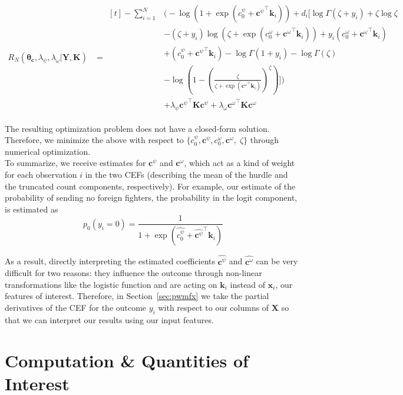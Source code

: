 \documentclass[12pt]{article}
\newcommand{\X}{\mathbf{X}}
\newcommand{\x}{\mathbf{x}}
\newcommand{\Y}{\mathbf{Y}}
\newcommand{\K}{\mathbf{K}}
\renewcommand{\k}{\mathbf{k}}
\newcommand{\bc}{\mathbf{c}}
\renewcommand{\r}{\right}
\renewcommand{\l}{\left}
\newcommand{\btheta}{\bm{\theta}}
\begin{document}
\begin{align}	\label{eqn:targetFinal}
  R_N (\btheta_{\bc}, \lambda_\psi, \lambda_\omega | \Y, \K) &= \begin{aligned}[t]
    - \sum^N_{i=1} & \Bigg( - \log \l(1 + \exp({c^\psi_0 + \bc^\psi}^\top \k_i) \r) +  d_i \Bigg[ \log \Gamma( \zeta + y_i ) + \zeta \log \zeta \\
      & - (\zeta + y_i) \log \l( \zeta + \exp({c^\omega_0 + \bc^\omega}^\top \k_i) \r) + y_i (c^\omega_0 + {\bc^\omega}^\top\k_i) \\
      & + (c^\psi_0 + {\bc^\psi}^\top \k_i) - \log \Gamma (1 + y_i) - \log \Gamma (\zeta) \\
      & - \log \l( 1 - \l( \frac{\zeta}{\zeta + \exp({\bc^\omega}^\top \k_i)} \r)^\zeta \r) \Bigg] \Bigg) \\
      & + \lambda_\psi {\bc^\psi}^\top \K \bc^\psi + \lambda_\omega {\bc^\omega}^\top \K \bc^\omega
    \end{aligned}
\end{align} 

The resulting optimization problem does not have a closed-form solution. Therefore, we minimize the above with respect to $\{ c^\psi_0, \bc^\psi, c^\omega_0, \bc^\omega, \; \zeta \}$ through numerical optimization.	\\ 

To summarize, we receive estimates for $\bc^\psi$ and $\bc^\omega$, which act as a kind of weight for each observation $i$ in the two CEFs (describing the mean of the hurdle and the truncated count components, respectively). For example, our estimate of the probability of sending no foreign fighters, the probability in the logit component, is estimated as $$p_0(y_i = 0) = \frac{1}{1 + \exp(\hat{c^\psi_0} + {\hat{\bc^\psi}}^\top \k_i)}$$

As a result, directly interpreting the estimated coefficients $\hat{\bc^\psi}$ and $\hat{\bc^\omega}$ can be very difficult for two reasons: they influence the outcome through non-linear transformations like the logistic function and are acting on $\k_i$ instead of $\x_i$, our features of interest. Therefore, in Section~\ref{sec:pwmfx} we take the partial derivatives of the CEF for the outcome $y_i$ with respect to our columns of $\X$ so that we can interpret our results using our input features.

\section{Computation \& Quantities of Interest}	\label{sec:computation}
\end{document}
